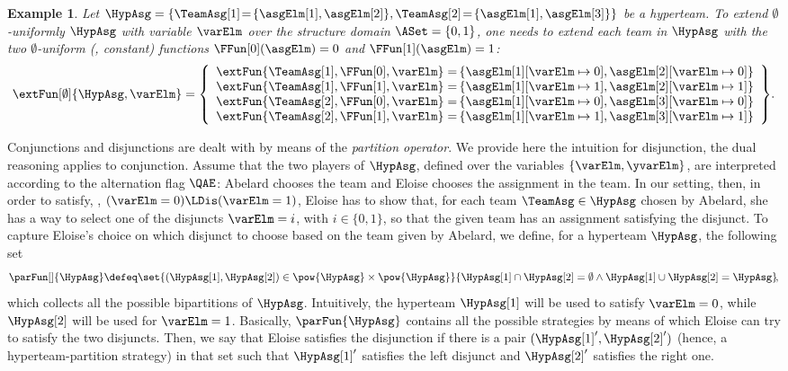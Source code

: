 \documentclass[authoryear]{elsarticle}
\newtheorem{example}{Example}
\begin{document}
\begin{example}
  \label{exm:ext}
  Let $\HypAsg = \{ \TeamAsg[1] \!=\! \{ \asgElm[1], \asgElm[2] \}, \TeamAsg[2]
  \!=\! \{  \asgElm[1], \asgElm[3] \} \}$ be a hyperteam.
  To extend $\emptyset$-uniformly $\HypAsg$ with variable $\varElm$ over the
  structure domain $\ASet = \{ 0, 1 \}$, one needs to extend each team in
  $\HypAsg$ with the two $\emptyset$-uniform (\ie, constant) functions
  $\FFun[0](\asgElm) = 0$ and $\FFun[1](\asgElm) = 1$:
  \[
    \extFun[\emptyset]{\HypAsg, \varElm} =
    \left\{
    \begin{array}{cl}
      {\extFun{\TeamAsg[1], \FFun[0], \varElm}} =
    &\!\!\!\!\!
      {\{ {\asgElm[1]}[\varElm \mapsto 0], {\asgElm[2]}[\varElm \mapsto 0] \}}
    \\
      {\extFun{\TeamAsg[1], \FFun[1], \varElm}} =
    &\!\!\!\!\!
      {\{ {\asgElm[1]}[\varElm \mapsto 1], {\asgElm[2]}[\varElm \mapsto 1] \}}
    \\
      {\extFun{\TeamAsg[2], \FFun[0], \varElm}} =
    &\!\!\!\!\!
      {\{ {\asgElm[1]}[\varElm \mapsto 0], {\asgElm[3]}[\varElm \mapsto 0] \}}
    \\
      {\extFun{\TeamAsg[2], \FFun[1], \varElm}} =
    &\!\!\!\!\!
      {\{ {\asgElm[1]}[\varElm \mapsto 1], {\asgElm[3]}[\varElm \mapsto 1] \}}
    \end{array}
    \right\}\!.
  \]
\end{example}

Conjunctions and disjunctions are dealt with by means of the \emph{partition
operator}.
We provide here the intuition for disjunction, the dual reasoning applies to
conjunction.
Assume that the two players of $\HypAsg$, defined over the variables $\{
\varElm, \yvarElm \}$, are interpreted according to the alternation flag $\QAE$:
Abelard chooses the team and Eloise chooses the assignment in the team.
In our setting, then, in order to satisfy, \eg, $(\varElm = 0) \LDis (\varElm =
1)$, Eloise has to show that, for each team $\TeamAsg \in \HypAsg$ chosen by
Abelard, she has a way to select one of the disjuncts $\varElm = i$, with $i \in
\{ 0, 1 \}$, so that the given team has an assignment satisfying the disjunct.
To capture Eloise's choice on which disjunct to choose based on the team given
by Abelard, we define, for a hyperteam $\HypAsg$, the following set
\[
  \parFun[]{\HypAsg} \defeq \set{ (\HypAsg[1], \HypAsg[2]) \in \pow{\HypAsg}
  \times \pow{\HypAsg} }{ \HypAsg[1] \cap \HypAsg[2] = \emptyset \land
  \HypAsg[1] \cup \HypAsg[2] = \HypAsg }\!,
\]
which collects all the possible bipartitions of $\HypAsg$.
Intuitively, the hyperteam $\HypAsg[1]$ will be used to satisfy $\varElm = 0$,
while $\HypAsg[2]$ will be used for $\varElm = 1$.
Basically, $\parFun{\HypAsg}$ contains all the possible strategies by means of
which Eloise can try to satisfy the two disjuncts.
Then, we say that Eloise satisfies the disjunction if there is a pair
$(\HypAsg[1]', \HypAsg[2]')$ (hence, a hyperteam-partition strategy) in that set
such that $\HypAsg[1]'$ satisfies the left disjunct and $\HypAsg[2]'$ satisfies
the right one.
\end{document}
